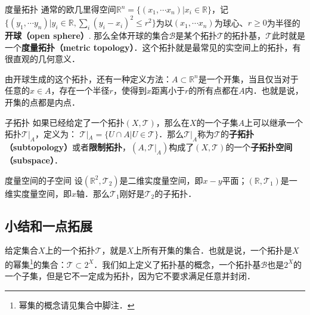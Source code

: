 \begin{example}{度量拓扑}
通常的欧几里得空间$\mathbb{R}^n=\{(x_1, \cdots x_n)|x_i\in \mathbb{R}\}$，记$\{(y_1, \cdots y_n)|y_i\in \mathbb{R}, \sum_i(y_i-x_i)^2\leq r^2\}$为以$(x_1, \cdots x_n)$为球心、$r\geqslant 0$为半径的\textbf{开球（open sphere）}. 那么全体开球的集合$\mathcal{B}$是某个拓扑$\mathcal{T}$的拓扑基，$\mathcal{T}$此时就是一个\textbf{度量拓扑（metric topology）}．这个拓扑就是最常见的实空间上的拓扑，有很直观的几何意义．

由开球生成的这个拓扑，还有一种定义方法：$A\subset \mathbb{R}^n$是一个开集，当且仅当对于任意的$x\in A$，存在一个半径$r$，使得到$x$距离小于$r$的所有点都在$A$内．也就是说，开集的点都是内点．
\end{example}


\begin{definition}{子拓扑}
如果已经给定了一个拓扑$(X, \mathcal{T})$，那么在$X$的一个子集$A$上可以继承一个拓扑$\mathcal{T}|_A$，定义为：
$\mathcal{T}|_A=\{U\cap A|U\in \mathcal{T}\}$．那么$\mathcal{T}|_A$称为$\mathcal{T}$的\textbf{子拓扑（subtopology）}或者\textbf{限制拓扑}，$(A, \mathcal{T}|_A)$构成了$(X, \mathcal{T})$的一个\textbf{子拓扑空间（subspace）}．
\end{definition}

\begin{example}{度量空间的子空间}
设$(\mathbb{R}^2, \mathcal{T}_2)$是二维实度量空间，即$x-y$平面；$(\mathbb{R}, \mathcal{T}_1)$是一维实度量空间，即$x$轴．那么$\mathcal{T}_1$刚好是$\mathcal{T}_2$的子拓扑．
\end{example}

\subsection{小结和一点拓展}

给定集合$X$上的一个拓扑$\mathcal{T}$，就是$X$上所有开集的集合．也就是说，一个拓扑是$X$的幂集\footnote{幂集的概念请见集合中脚注．}的集合：$\mathcal{T}\subset 2^X$．我们如上定义了拓扑基的概念，一个拓扑基$\mathcal{B}$也是$2^X$的一个子集，但是它不一定成为拓扑，因为它不要求满足任意并封闭．

